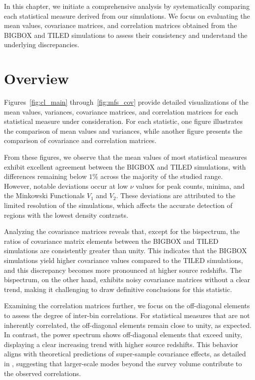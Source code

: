 In this chapter, we initiate a comprehensive analysis by systematically comparing each statistical measure derived from our simulations. We focus on evaluating the mean values, covariance matrices, and correlation matrices obtained from the BIGBOX and TILED simulations to assess their consistency and understand the underlying discrepancies.

\section{Overview}
Figures~\ref{fig:cl_main} through~\ref{fig:mfs_cov} provide detailed visualizations of the mean values, variances, covariance matrices, and correlation matrices for each statistical measure under consideration. For each statistic, one figure illustrates the comparison of mean values and variances, while another figure presents the comparison of covariance and correlation matrices. 

From these figures, we observe that the mean values of most statistical measures exhibit excellent agreement between the BIGBOX and TILED simulations, with differences remaining below $1\%$ across the majority of the studied range. However, notable deviations occur at low $\nu$ values for peak counts, minima, and the Minkowski Functionals $V_1$ and $V_2$. These deviations are attributed to the limited resolution of the simulations, which affects the accurate detection of regions with the lowest density contrasts.

Analyzing the covariance matrices reveals that, except for the bispectrum, the ratios of covariance matrix elements between the BIGBOX and TILED simulations are consistently greater than unity. This indicates that the BIGBOX simulations yield higher covariance values compared to the TILED simulations, and this discrepancy becomes more pronounced at higher source redshifts. The bispectrum, on the other hand, exhibits noisy covariance matrices without a clear trend, making it challenging to draw definitive conclusions for this statistic.

Examining the correlation matrices further, we focus on the off-diagonal elements to assess the degree of inter-bin correlations. For statistical measures that are not inherently correlated, the off-diagonal elements remain close to unity, as expected. In contrast, the power spectrum shows off-diagonal elements that exceed unity, displaying a clear increasing trend with higher source redshifts. This behavior aligns with theoretical predictions of super-sample covariance effects, as detailed in \citet{PhysRevD.87.123504}, suggesting that larger-scale modes beyond the survey volume contribute to the observed correlations.

